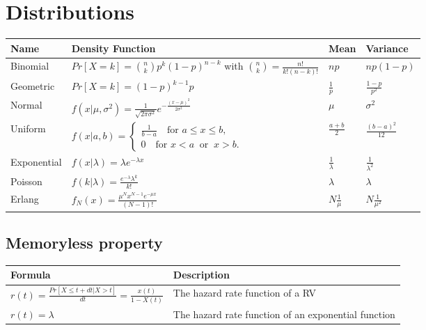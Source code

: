 \documentclass{article}
\begin{document}
\section{Distributions}
\renewcommand{\arraystretch}{2} %
\setlength{\tabcolsep}{8pt}
\begin{longtable}{| p{3cm} | p{7cm} | p{2cm} | p{2cm} |}
    \hline
    \textbf{Name} & \textbf{Density Function} & \textbf{Mean} & \textbf{Variance} \\ \hline
    \endhead
    \hline
    \endfoot
    Binomial & $ Pr[X = k] = \binom{n}{k} p^k(1 - p)^{n-k} $ with $\binom{n}{k} = \frac{n!}{k!(n-k)!} $ & $np$ & $np(1-p)$\\
    \hline
    Geometric & $ Pr[X = k] = (1 - p)^{k-1}p $ & $\frac{1}{p}$ & $ \frac{1-p}{p^2} $\\
    \hline
    Normal & $ f(x|\mu, \sigma^2) = \frac{1}{\sqrt{2 \pi \sigma^2}} e^{-\frac{(x - \mu)^2}{2 \sigma^2}} $ & $\mu$ & $ \sigma^2 $\\
    \hline
    Uniform & $ f(x|a, b) = {\begin{cases}{\frac {1}{b-a}}\quad {\text{for }}a\leq x\leq b,\\[8pt]0 \quad{\text{for }}x<a\ {\text{ or }}\ x>b.\end{cases}} $ & $\frac{a + b}{2} $ & $\frac{(b - a)^2}{12}$ \\
    \hline
    Exponential & $ f(x|\lambda) = \lambda e^{- \lambda x}$ & $\frac{1}{\lambda}$ & $\frac{1}{\lambda^2}$ \\
    \hline
    Poisson & $ f(k|\lambda) = \frac{e^{-\lambda}\lambda^k}{k!}$ & $\lambda$ & $\lambda$ \\
    \hline
    Erlang & $ f_N(x) = \frac{\mu^N x^{N-1} e^{-\mu x}}{(N - 1)!}$ & $N\frac{1}{\mu}$ & $N\frac{1}{\mu^2}$ \\
    \hline
\end{longtable}

\subsection{Memoryless property}

\begin{longtable}{| p{7cm} | p{8cm} |}
    \hline
    \textbf{Formula} & \textbf{Description}  \\ \hline
    \endhead
    \hline
    \endfoot
	$ r(t) = \frac{Pr[X \le t +dt | X > t]}{dt} = \frac{x(t)}{1 - X(t)}$ & The hazard rate function of a RV \\
    \hline
    $ r(t) = \lambda $ & The hazard rate function of an exponential function \\
    \hline
\end{longtable}
\end{document}
